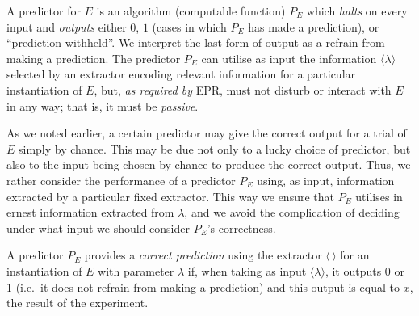 \documentclass[%
 superscriptaddress,
 preprint,
 showpacs,
 showkeys,
 preprintnumbers,
  amsmath,amssymb,
  aps,
 pra,
  longbibliography,
  floatfix,
 ]{revtex4-1}
\theoremstyle{definition}
\begin{document}
A predictor for $E$ is an algorithm  (computable function) $P_E$
which \emph{halts} on every input and \emph{outputs} either $0$, $1$ (cases in which  $P_E$ has made a prediction), or ``prediction withheld''.
We interpret the last form of output as a refrain from making a prediction.
The predictor
$P_E$ can utilise as input the information $\langle\lambda\rangle$ selected by an extractor
encoding  relevant information for a particular instantiation of $E$, but, {\em as required by} EPR,  must not disturb or interact with $E$ in any way;
that is, it must be \emph{passive}.


As we noted earlier, a certain predictor may give the correct output for a trial of $E$ simply by chance.
This may be due not only to a lucky choice of predictor, but also to the input being chosen by chance to produce the correct output.
Thus, we rather  consider the performance of a predictor $P_E$  using, as input, information extracted by a particular fixed extractor.
This way we ensure that $P_E$ utilises in ernest information extracted from $\lambda$,
and we avoid the complication of deciding under what input we should consider $P_E$'s correctness.

A predictor $P_E$ provides a \emph{correct prediction} using the extractor $\langle \, \rangle$ for an instantiation of $E$ with parameter $\lambda$ if, %
when taking as input $\langle \lambda \rangle$,
it outputs 0 or 1 (i.e.\ it does not refrain from making a prediction) and this output is equal to $x$, the result of the experiment.
\end{document}
